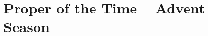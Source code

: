 \chapter{Proper of the Time -- Advent Season}
\newcommand{\benedicamusdomino}[1][advent]{
	\noindent\printnote{\Vbar~\emph{Benedicámus Dómino}, page \pageref{benedicamusdomino-#1}.}
	\bigskip
	\hrule
}
\newcommand{\printhymnnote}{
	\noindent\printnote{Hymn. \emph{Créator alme síderum}, page \pageref{hymn-creatoralmesiderum}.
	\Vbar~\emph{Roráte}, page \pageref{vr-rorate}.}
}
\newcommand{\printoant}[2]{
{
\needspace{5\baselineskip}
\subtitle{December #1}
\printgabc{\small At Magn.}{\small \oldstylenums{Ant. 2. D}}{O}{December#1-MagAntiphon}
\translation[]{#2}
}
}

\normalsize
\newcommand{\psalmcolsoverride}[1][0]{
\def\beginpsalmcols{\begin{parcolumns}[rulebetween,colwidths={1=0.45\linewidth}]{2}}
\ifnum#1=110
\def\beginpsalmcols{\begin{parcolumns}[rulebetween,colwidths={1=0.45\linewidth}]{2}}
\fi
\ifnum#1=111
\def\beginpsalmcols{\begin{parcolumns}[rulebetween,colwidths={1=0.475\linewidth}]{2}}
\fi
}

